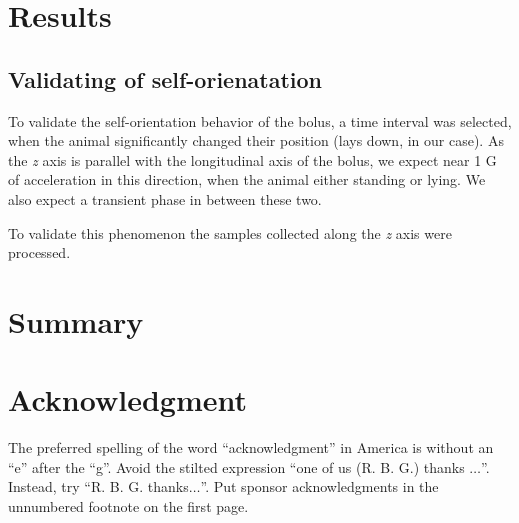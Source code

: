 \documentclass[conference]{IEEEtran}
\begin{document}
\section{Results}

\subsection{Validating of self-orienatation}

To validate the self-orientation behavior of the bolus, a time interval was
selected, when the animal significantly changed their position (lays down,
in our case). As the \emph{z} axis is parallel with the longitudinal axis
of the bolus, we expect near 1 G of acceleration in this direction, when
the animal either standing or lying. We also expect a transient phase in
between these two.

To validate this phenomenon the samples collected along the \emph{z} axis
were processed. 

\section{Summary}

\section*{Acknowledgment}

The preferred spelling of the word ``acknowledgment'' in America is without 
an ``e'' after the ``g''. Avoid the stilted expression ``one of us (R. B. 
G.) thanks $\ldots$''. Instead, try ``R. B. G. thanks$\ldots$''. Put sponsor 
acknowledgments in the unnumbered footnote on the first page.



\end{document}
